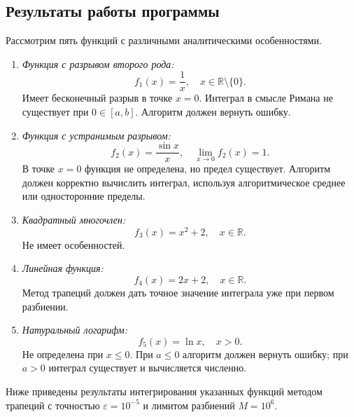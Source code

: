 \subsection{Результаты работы программы}

Рассмотрим пять функций с различными аналитическими особенностями.

\begin{enumerate}
    \item \textit{Функция с разрывом второго рода:}
    \[
    f_1(x) = \frac{1}{x}, \quad x \in \mathbb{R} \setminus \{0\}.
    \]
    Имеет бесконечный разрыв в точке $x = 0$. Интеграл в смысле Римана не существует при $0 \in [a, b]$. Алгоритм должен вернуть ошибку.

    \item \textit{Функция с устранимым разрывом:}
    \[
    f_2(x) = \frac{\sin x}{x}, \quad \lim_{x \to 0} f_2(x) = 1.
    \]
    В точке $x = 0$ функция не определена, но предел существует. Алгоритм должен корректно вычислить интеграл, используя алгоритмическое среднее или односторонние пределы.

    \item \textit{Квадратный многочлен:}
    \[
    f_3(x) = x^2 + 2, \quad x \in \mathbb{R}.
    \]
    Не имеет особенностей.

    \item \textit{Линейная функция:}
    \[
    f_4(x) = 2x + 2, \quad x \in \mathbb{R}.
    \]
    Метод трапеций должен дать точное значение интеграла уже при первом разбиении.

    \item \textit{Натуральный логарифм:}
    \[
    f_5(x) = \ln x, \quad x > 0.
    \]
    Не определена при $x \le 0$. При $a \le 0$ алгоритм должен вернуть ошибку; при $a > 0$ интеграл существует и вычисляется численно.
\end{enumerate}

Ниже приведены результаты интегрирования указанных функций методом трапеций с точностью $\varepsilon = 10^{-5}$ и лимитом разбиений $M = 10^6$.

